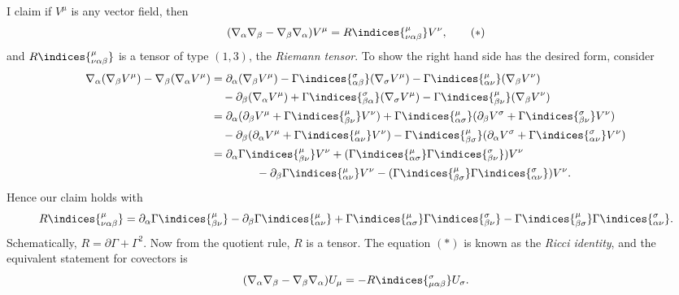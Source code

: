 \documentclass[12pt]{article}
\begin{document}
I claim if $V^\mu$ is any vector field, then
\[
	(\nabla_\alpha \nabla_\beta - \nabla_\beta \nabla_\alpha) V^\mu = R\indices{^\mu_{\nu\alpha\beta}} V^\nu, \tag{$\ast$}
\]
and $R\indices{^\mu_{\nu\alpha\beta}}$ is a tensor of type $(1, 3)$, the \emph{Riemann tensor}. To show the right hand side has the desired form, consider
\begin{align*}
	\nabla_\alpha(\nabla_\beta V^\mu) -\nabla_\beta(\nabla_\alpha V^\mu) &= \partial_\alpha (\nabla_\beta V^\mu) - \Gamma\indices{^\sigma_{\alpha\beta}}(\nabla_\sigma V^\mu) - \Gamma\indices{^\mu_{\alpha\nu}}(\nabla_\beta V^\nu) \\
									     & \quad- \partial_\beta(\nabla_\alpha V^\mu) + \Gamma\indices{^\sigma_{\beta\alpha}}(\nabla_\sigma V^\mu) - \Gamma\indices{^\mu_{\beta\nu}}(\nabla_\beta V^\nu) \\
									     &= \partial_\alpha(\partial_\beta V^\mu + \Gamma\indices{^\mu_{\beta\nu}}V^\nu) + \Gamma\indices{^\mu_{\alpha\sigma}}(\partial_\beta V^\sigma + \Gamma\indices{^\sigma_{\beta\nu}} V^\nu) \\
									     & \quad- \partial_\beta (\partial_\alpha V^\mu + \Gamma\indices{^\mu_{\alpha\nu}}V^\nu) - \Gamma\indices{^\mu_{\beta\sigma}}(\partial_\alpha V^\sigma + \Gamma\indices{^\sigma_{\alpha\nu}}V^\nu) \\
									     &= \partial_\alpha \Gamma\indices{^\mu_{\beta\nu}}V^\nu + (\Gamma\indices{^\mu_{\alpha\sigma}}\Gamma\indices{^\sigma_{\beta\nu}})V^\nu \\
									     & \qquad \qquad - \partial_\beta \Gamma\indices{^\mu_{\alpha\nu}}V^\nu - (\Gamma\indices{^\mu_{\beta\sigma}}\Gamma\indices{^\sigma_{\alpha\nu}}) V^\nu.
\end{align*}
Hence our claim holds with
\[
	R\indices{^\mu_{\nu\alpha\beta}} = \partial_\alpha \Gamma\indices{^\mu_{\beta\nu}} - \partial_\beta \Gamma\indices{^\mu_{\alpha\nu}} + \Gamma\indices{^\mu_{\alpha\sigma}} \Gamma\indices{^\sigma_{\beta\nu}} - \Gamma\indices{^\mu_{\beta\sigma}} \Gamma\indices{^\sigma_{\alpha\nu}}.
\]
Schematically, $R = \partial \Gamma + \Gamma^2$. Now from the quotient rule, $R$ is a tensor. The equation $(\ast)$ is known as the \emph{Ricci identity}, and the equivalent statement for covectors is
\[
	(\nabla_\alpha \nabla_\beta - \nabla_\beta \nabla_\alpha) U_\mu = - R\indices{^\sigma_{\mu\alpha\beta}} U_\sigma.
\]
\end{document}
